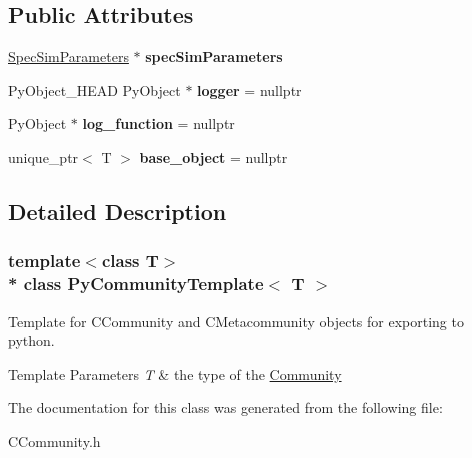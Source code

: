 \subsection*{Public Attributes}
\begin{DoxyCompactItemize}
\item 
\hyperlink{struct_spec_sim_parameters}{Spec\+Sim\+Parameters} $\ast$ {\bfseries spec\+Sim\+Parameters}\hypertarget{class_py_community_template_a37402f384e75c02c50360cecfe6b2267}{}\label{class_py_community_template_a37402f384e75c02c50360cecfe6b2267}

\item 
Py\+Object\+\_\+\+H\+E\+AD Py\+Object $\ast$ {\bfseries logger} = nullptr\hypertarget{class_py_template_a5b741a472639d65f9bcad29afa16ec99}{}\label{class_py_template_a5b741a472639d65f9bcad29afa16ec99}

\item 
Py\+Object $\ast$ {\bfseries log\+\_\+function} = nullptr\hypertarget{class_py_template_a98bb8152faa73d028342d5cf260f0372}{}\label{class_py_template_a98bb8152faa73d028342d5cf260f0372}

\item 
unique\+\_\+ptr$<$ T $>$ {\bfseries base\+\_\+object} = nullptr\hypertarget{class_py_template_a14da655e6d3c0b398d8478058316d326}{}\label{class_py_template_a14da655e6d3c0b398d8478058316d326}

\end{DoxyCompactItemize}


\subsection{Detailed Description}
\subsubsection*{template$<$class T$>$\\*
class Py\+Community\+Template$<$ T $>$}

Template for C\+Community and C\+Metacommunity objects for exporting to python. 


\begin{DoxyTemplParams}{Template Parameters}
{\em T} & the type of the \hyperlink{class_community}{Community} \\
\hline
\end{DoxyTemplParams}


The documentation for this class was generated from the following file\+:\begin{DoxyCompactItemize}
\item 
C\+Community.\+h\end{DoxyCompactItemize}
